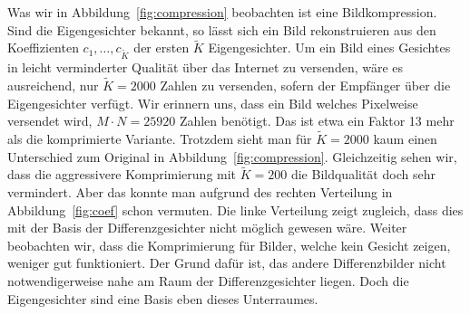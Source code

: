 Was wir in Abbildung~\ref{fig:compression} beobachten ist eine Bildkompression.
Sind die Eigengesichter bekannt, so lässt sich ein Bild rekonstruieren aus den Koeffizienten $c_1,\ldots,c_{\tilde K}$ der ersten $\tilde K$ Eigengesichter.
Um ein Bild eines Gesichtes in leicht verminderter Qualität über das Internet zu versenden, wäre es ausreichend, nur $\tilde K=2000$ Zahlen zu versenden, sofern der Empfänger über die Eigengesichter verfügt.
Wir erinnern uns, dass ein Bild welches Pixelweise versendet wird, $M\cdot N=25920$ Zahlen benötigt.
Das ist etwa ein Faktor 13 mehr als die komprimierte Variante.
Trotzdem sieht man für $\tilde K=2000$ kaum einen Unterschied zum Original in Abbildung~\ref{fig:compression}.
Gleichzeitig sehen wir, dass die aggressivere Komprimierung mit $\tilde K=200$ die Bildqualität doch sehr vermindert.
Aber das konnte man aufgrund des rechten Verteilung in Abbildung~\ref{fig:coef} schon vermuten.
Die linke Verteilung zeigt zugleich, dass dies mit der Basis der Differenzgesichter nicht möglich gewesen wäre.
Weiter beobachten wir, dass die Komprimierung für Bilder, welche kein Gesicht zeigen, weniger gut funktioniert.
Der Grund dafür ist, das andere Differenzbilder nicht notwendigerweise nahe am Raum der Differenzgesichter liegen.
Doch die Eigengesichter sind eine Basis eben dieses Unterraumes.